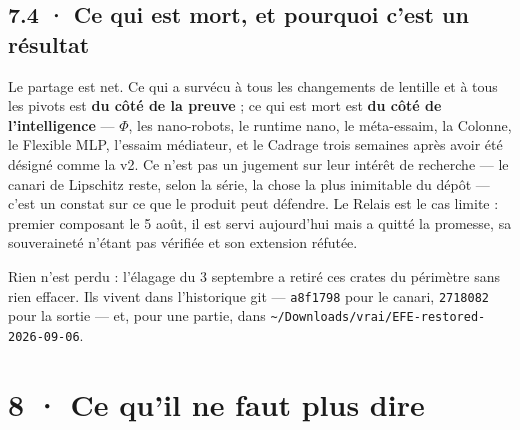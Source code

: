 \documentclass[10pt]{article}
\newcommand{\code}[1]{\texttt{\small #1}}
\begin{document}
\subsection{7.4 · Ce qui est mort, et pourquoi c'est un résultat}

Le partage est net. Ce qui a survécu à tous les changements de lentille et à tous les pivots est \textbf{du côté de
la preuve} ; ce qui est mort est \textbf{du côté de l'intelligence} --- $\Phi$, les nano-robots, le runtime nano, le
méta-essaim, la Colonne, le Flexible MLP, l'essaim médiateur, et le Cadrage trois semaines après avoir été désigné
comme la v2. Ce n'est pas un jugement sur leur intérêt de recherche --- le canari de Lipschitz reste, selon la série,
la chose la plus inimitable du dépôt --- c'est un constat sur ce que le produit peut défendre. Le Relais est le cas
limite : premier composant le 5 août, il est servi aujourd'hui mais a quitté la promesse, sa souveraineté n'étant pas
vérifiée et son extension réfutée.

Rien n'est perdu : l'élagage du 3 septembre a retiré ces crates du périmètre sans rien effacer. Ils vivent dans
l'historique git --- \code{a8f1798} pour le canari, \code{2718082} pour la sortie --- et, pour une partie, dans
\code{\textasciitilde/\allowbreak Downloads/\allowbreak vrai/\allowbreak EFE-restored-2026-09-06}.

\section{8 · Ce qu'il ne faut plus dire}
\end{document}
